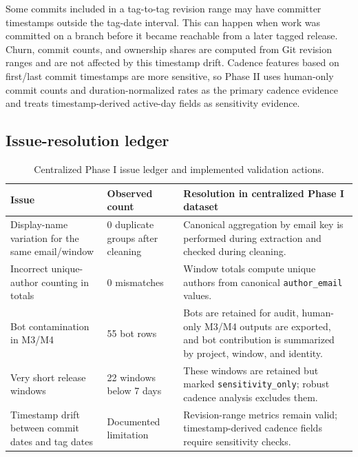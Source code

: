 Some commits included in a tag-to-tag revision range may have committer timestamps outside the tag-date interval. This can happen
when work was committed on a branch before it became reachable from a later tagged release. Churn, commit counts, and ownership
shares are computed from Git revision ranges and are not affected by this timestamp drift. Cadence features based on first/last
commit timestamps are more sensitive, so Phase II uses human-only commit counts and duration-normalized rates as the primary
cadence evidence and treats timestamp-derived active-day fields as sensitivity evidence.

\subsection{Issue-resolution ledger}
\label{sec:phase1_issue_ledger}

\begin{table}[H]
\centering
\footnotesize
\renewcommand{\arraystretch}{1.15}
\begin{tabularx}{\textwidth}{p{4.1cm}p{2.3cm}X}
\toprule
\textbf{Issue} & \textbf{Observed count} & \textbf{Resolution in centralized Phase I dataset} \\
\midrule
Display-name variation for the same email/window & 0 duplicate groups after cleaning & Canonical aggregation by email key is performed during extraction and checked during cleaning. \\
Incorrect unique-author counting in totals & 0 mismatches & Window totals compute unique authors from canonical \texttt{author\_email} values. \\
Bot contamination in M3/M4 & 55 bot rows & Bots are retained for audit, human-only M3/M4 outputs are exported, and bot contribution is summarized by project, window, and identity. \\
Very short release windows & 22 windows below 7 days & These windows are retained but marked \texttt{sensitivity\_only}; robust cadence analysis excludes them. \\
Timestamp drift between commit dates and tag dates & Documented limitation & Revision-range metrics remain valid; timestamp-derived cadence fields require sensitivity checks. \\
\bottomrule
\end{tabularx}
\caption{Centralized Phase I issue ledger and implemented validation actions.}
\label{tab:round1_issue_ledger}
\end{table}

